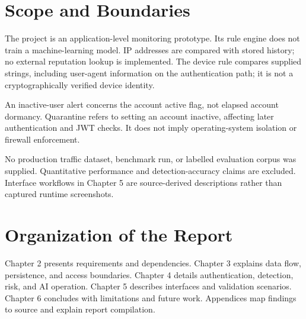 \section{Scope and Boundaries}
The project is an application-level monitoring prototype. Its rule engine does not train a machine-learning model. IP addresses are compared with stored history; no external reputation lookup is implemented. The device rule compares supplied strings, including user-agent information on the authentication path; it is not a cryptographically verified device identity.

An inactive-user alert concerns the account active flag, not elapsed account dormancy. Quarantine refers to setting an account inactive, affecting later authentication and JWT checks. It does not imply operating-system isolation or firewall enforcement.

No production traffic dataset, benchmark run, or labelled evaluation corpus was supplied. Quantitative performance and detection-accuracy claims are excluded. Interface workflows in Chapter 5 are source-derived descriptions rather than captured runtime screenshots.

\section{Organization of the Report}
Chapter 2 presents requirements and dependencies. Chapter 3 explains data flow, persistence, and access boundaries. Chapter 4 details authentication, detection, risk, and AI operation. Chapter 5 describes interfaces and validation scenarios. Chapter 6 concludes with limitations and future work. Appendices map findings to source and explain report compilation.
